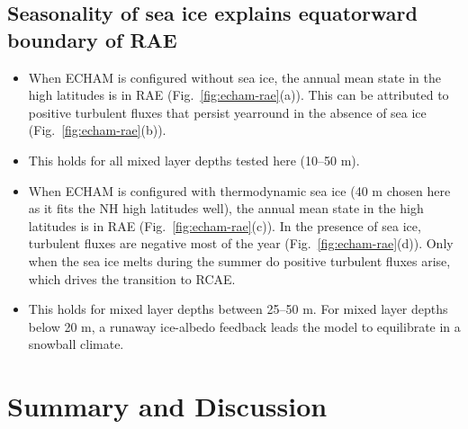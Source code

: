 \documentclass{ametsocV5}
\begin{document}
\subsection{Seasonality of sea ice explains equatorward boundary of RAE}
\begin{itemize}
  \item When ECHAM is configured without sea ice, the annual mean state in the high latitudes is in RAE (Fig.~\ref{fig:echam-rae}(a)). This can be attributed to positive turbulent fluxes that persist yearround in the absence of sea ice (Fig.~\ref{fig:echam-rae}(b)).
  \item This holds for all mixed layer depths tested here (10--50 m).
  \item When ECHAM is configured with thermodynamic sea ice (40 m chosen here as it fits the NH high latitudes well), the annual mean state in the high latitudes is in RAE (Fig.~\ref{fig:echam-rae}(c)). In the presence of sea ice, turbulent fluxes are negative most of the year (Fig.~\ref{fig:echam-rae}(d)). Only when the sea ice melts during the summer do positive turbulent fluxes arise, which drives the transition to RCAE.
  \item This holds for mixed layer depths between 25--50 m. For mixed layer depths below 20 m, a runaway ice-albedo feedback leads the model to equilibrate in a snowball climate.
\end{itemize}

\section{Summary and Discussion}
\end{document}
